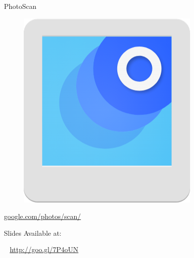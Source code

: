 \documentclass[serif,14pt,color=usenames,dvipsnames]{beamer}
\begin{document}
\begin{frame}{PhotoScan}
  \centering

  \begin{figure}
  \includegraphics[width=0.3\linewidth]{imgs/photoscan2}
  \end{figure}
  \vspace{0.5cm}
  \href{https://google.com/photos/scan/}{google.com/photos/scan/}
\end{frame}

\begin{frame}{Slides}
Available at:
\begin{block}{~}
  \url{http://goo.gl/7P4oUN}
\end{block}
\end{frame}
\end{document}

